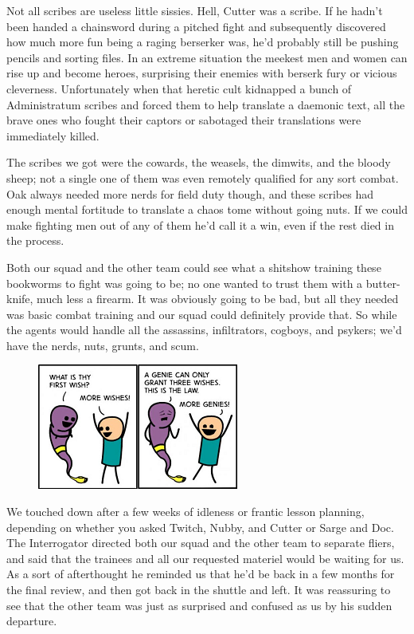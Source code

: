 Not all scribes are useless little sissies. 
Hell, Cutter was a scribe. 
If he hadn’t been handed a chainsword during a pitched fight and subsequently discovered how much more fun being a raging berserker was, he’d probably still be pushing pencils and sorting files. 
In an extreme situation the meekest men and women can rise up and become heroes, surprising their enemies with berserk fury or vicious cleverness. 
Unfortunately when that heretic cult kidnapped a bunch of Administratum scribes and forced them to help translate a daemonic text, all the brave ones who fought their captors or sabotaged their translations were immediately killed. 


The scribes we got were the cowards, the weasels, the dimwits, and the bloody sheep; 
not a single one of them was even remotely qualified for any sort combat. 
Oak always needed more nerds for field duty though, and these scribes had enough mental fortitude to translate a chaos tome without going nuts. 
If we could make fighting men out of any of them he’d call it a win, even if the rest died in the process.

Both our squad and the other team could see what a shitshow training these bookworms to fight was going to be; 
no one wanted to trust them with a butter-knife, much less a firearm. 
It was obviously going to be bad, but all they needed was basic combat training and our squad could definitely provide that. 
So while the agents would handle all the assassins, infiltrators, cogboys, and psykers; 
we’d have the nerds, nuts, grunts, and scum.

\begin{figure}
	\begin{center}
		\includegraphics[width=\figwidth]{pics/8/7.png}
	\end{center}
\end{figure}
We touched down after a few weeks of idleness or frantic lesson planning, depending on whether you asked Twitch, Nubby, and Cutter or Sarge and Doc. 
The Interrogator directed both our squad and the other team to separate fliers, and said that the trainees and all our requested materiel would be waiting for us. 
As a sort of afterthought he reminded us that he’d be back in a few months for the final review, and then got back in the shuttle and left. 
It was reassuring to see that the other team was just as surprised and confused as us by his sudden departure.

